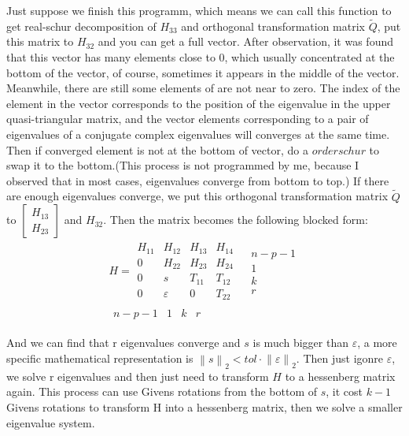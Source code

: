 Just suppose we finish this programm, which means we can call this function to get real-schur decomposition of \(H_{33}\) and orthogonal transformation matrix \(\widetilde Q\), put this matrix to \(H_{32}\) and you can get a full vector. After observation, it was found that this vector has many elements close to 0, which usually concentrated at the bottom of the vector, of course, sometimes it appears in the middle of the vector. Meanwhile, there are still some elements of are not near to zero. The index of the element in the vector corresponds to the position of the eigenvalue in the upper quasi-triangular matrix, and the vector elements corresponding to a pair of eigenvalues of a conjugate complex eigenvalues will converges at the same time. Then if converged element is not at the bottom of vector, do a \(orderschur\) to swap it to the bottom.(This process is not programmed by me, because I observed that in most cases, eigenvalues converge from bottom to top.) If there are enough eigenvalues converge, we put this orthogonal transformation matrix \(\widetilde Q\) to \(\left[ {\begin{array}{*{20}{c}}
{{H_{13}}}\\
{{H_{23}}}
\end{array}} \right]\) and \(H_{32}\). Then the matrix becomes the following blocked form:
\[{\begin{array}{*{20}{c}}
{H = \begin{array}{*{20}{c}}
{{H_{11}}}&{{H_{12}}}&{{H_{13}}}&{{H_{14}}}\\
0&{{H_{22}}}&{{H_{23}}}&{{H_{24}}}\\
0&s&{{T_{11}}}&{{T_{12}}}\\
0&\varepsilon &0&{{T_{22}}}
\end{array}}&{\begin{array}{*{20}{c}}
{n - p - 1}\\
1\\
k\\
r
\end{array}}\\
{\begin{array}{*{20}{c}}
{n - p - 1}&1&k&r
\end{array}}&{}
\end{array}}\]

And we can find that r eigenvalues converge and \(s\) is much bigger than \(\varepsilon\), a more specific mathematical representation is \({{{\left\| s \right\|}_2} < tol \cdot {{\left\| \varepsilon  \right\|}_2}}\). Then just igonre \(\varepsilon\), we solve r eigenvalues and then just need to transform \(H\) to a hessenberg matrix again. This process can use Givens rotations from the bottom of \(s\), it cost \(k-1\) Givens rotations to transform H into a hessenberg matrix, then we solve a smaller eigenvalue system.

